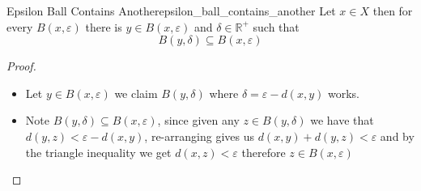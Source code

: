 \begin{lemma}{Epsilon Ball Contains Another}{epsilon_ball_contains_another}
    Let $ x \in X $ then for every $ B\left( x, \varepsilon  \right)  $ there is $ y \in B\left( x, \varepsilon  \right)  $ and $ \delta \in  \mathbb{R} ^{ +  }  $ such that 
    \[
    B\left( y, \delta  \right) \subseteq B\left( x, \varepsilon  \right) 
    \]
\end{lemma}
\begin{proof}
    \begin{itemize}
        \item Let $ y \in  B\left( x, \varepsilon \right)  $ we claim  $ B\left( y, \delta  \right)  $ where $ \delta =  \varepsilon -  d\left( x,y \right)  $ works.
        \item Note $ B\left( y, \delta  \right) \subseteq B\left( x, \varepsilon  \right)  $, since given any $ z \in B\left( y, \delta  \right)  $ we have that $ d\left( y, z \right) < \varepsilon  - d\left( x,y \right)$, re-arranging gives us $ d\left( x,y \right) +  d\left( y, z \right) < \varepsilon   $ and by the triangle inequality we get $ d\left( x, z  \right) < \varepsilon  $ therefore $ z \in  B\left( x, \varepsilon  \right)  $
    \end{itemize}
\end{proof}
